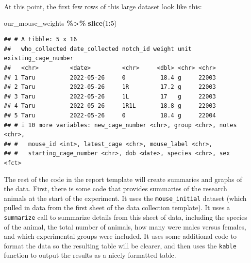 \documentclass[
]{book}
\newenvironment{Shaded}{\begin{snugshade}}{\end{snugshade}}
\newcommand{\DecValTok}[1]{\textcolor[rgb]{0.00,0.00,0.81}{#1}}
\newcommand{\FunctionTok}[1]{\textcolor[rgb]{0.13,0.29,0.53}{\textbf{#1}}}
\newcommand{\NormalTok}[1]{#1}
\newcommand{\SpecialCharTok}[1]{\textcolor[rgb]{0.81,0.36,0.00}{\textbf{#1}}}
\begin{document}
At this point, the first few rows of this large dataset look like this:

\begin{Shaded}
\begin{Highlighting}[]
\NormalTok{our\_mouse\_weights }\SpecialCharTok{\%\textgreater{}\%} 
  \FunctionTok{slice}\NormalTok{(}\DecValTok{1}\SpecialCharTok{:}\DecValTok{5}\NormalTok{)}
\end{Highlighting}
\end{Shaded}

\begin{verbatim}
## # A tibble: 5 x 16
##   who_collected date_collected notch_id weight unit  existing_cage_number
##   <chr>         <date>         <chr>     <dbl> <chr> <chr>               
## 1 Taru          2022-05-26     0          18.4 g     22003               
## 2 Taru          2022-05-26     1R         17.2 g     22003               
## 3 Taru          2022-05-26     1L         17   g     22003               
## 4 Taru          2022-05-26     1R1L       18.8 g     22003               
## 5 Taru          2022-05-26     0          18.4 g     22004               
## # i 10 more variables: new_cage_number <chr>, group <chr>, notes <chr>,
## #   mouse_id <int>, latest_cage <chr>, mouse_label <chr>,
## #   starting_cage_number <chr>, dob <date>, species <chr>, sex <fct>
\end{verbatim}

The rest of the code in the report template will create summaries and graphs of the
data. First, there is some code that provides summaries of the research animals at
the start of the experiment. It uses the \texttt{mouse\_initial} dataset (which pulled
in data from the first sheet of the data collection template). It uses a
\texttt{summarize} call to summarize details from this sheet of data, including the
species of the animal, the total number of animals, how many were males versus
females, and which experimental groups were included. It uses some additional
code to format the data so the resulting table will be clearer, and then
uses the \texttt{kable} function to output the results as a nicely formatted table.
\end{document}
